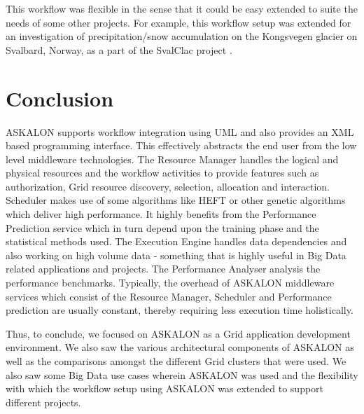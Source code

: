 \documentclass[9pt,twocolumn,twoside]{../../styles/osajnl}
\begin{document}
This workflow was flexible in the sense that it could be easy extended
to suite the needs of some other projects.  For example, this workflow
setup was extended for an investigation of precipitation/snow
accumulation on the Kongsvegen glacier on Svalbard, Norway, as a part
of the SvalClac project \cite{ASKALON-Big-data-project}.

\section{Conclusion}

ASKALON supports workflow integration using UML and also provides an
XML based programming interface.  This effectively abstracts the end
user from the low level middleware technologies.  The Resource Manager
handles the logical and physical resources and the workflow activities
to provide features such as authorization, Grid resource discovery,
selection, allocation and interaction.  Scheduler makes use of some
algorithms like HEFT or other genetic algorithms which deliver high
performance.  It highly benefits from the Performance Prediction
service which in turn depend upon the training phase and the
statistical methods used.  The Execution Engine handles data
dependencies and also working on high volume data - something that is
highly useful in Big Data related applications and projects.  The
Performance Analyser analysis the performance benchmarks.  Typically,
the overhead of ASKALON middleware services which consist of the
Resource Manager, Scheduler and Performance prediction are usually
constant, thereby requiring less execution time holistically.

Thus, to conclude, we focused on ASKALON as a Grid application
development environment.  We also saw the various architectural
components of ASKALON as well as the comparisons amongst the different
Grid clusters that were used.  We also saw some Big Data use cases
wherein ASKALON was used and the flexibility with which the workflow
setup using ASKALON was extended to support different projects.



\end{document}
